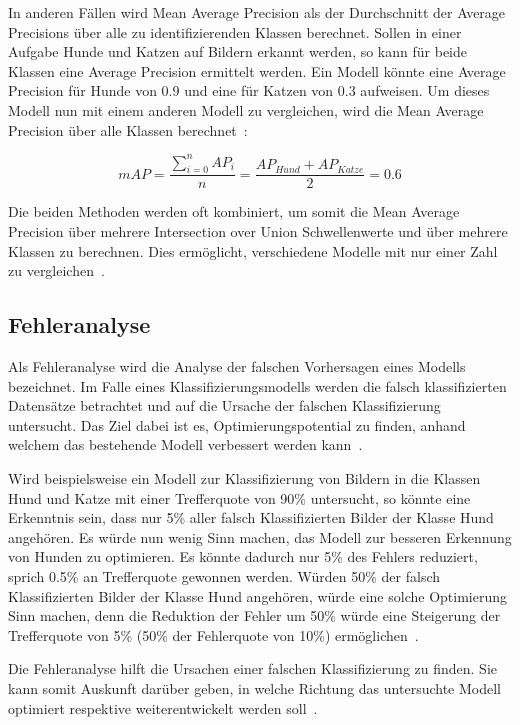 In anderen Fällen wird Mean Average Precision als der Durchschnitt der Average Precisions über alle zu identifizierenden Klassen berechnet. Sollen in einer Aufgabe Hunde und Katzen auf Bildern erkannt werden, so kann für beide Klassen eine Average Precision ermittelt werden. Ein Modell könnte eine Average Precision für Hunde von 0.9 und eine für Katzen von 0.3 aufweisen. Um dieses Modell nun mit einem anderen Modell zu vergleichen, wird die Mean Average Precision über alle Klassen berechnet~\autocite{AP}:

$$mAP = \frac{\sum_{i=0}^{n}AP_{i}}{n} = \frac{AP_{Hund}+AP_{Katze}}{2} = 0.6$$

Die beiden Methoden werden oft kombiniert, um somit die Mean Average Precision über mehrere Intersection over Union Schwellenwerte und über mehrere Klassen zu berechnen. Dies ermöglicht, verschiedene Modelle mit nur einer Zahl zu vergleichen~\autocite{AP}.

\subsection{Fehleranalyse}
\label{chap:error-analysis}

Als Fehleranalyse wird die Analyse der falschen Vorhersagen eines Modells bezeichnet. Im Falle eines Klassifizierungsmodells werden die falsch klassifizierten Datensätze betrachtet und auf die Ursache der falschen Klassifizierung untersucht. Das Ziel dabei ist es, Optimierungspotential zu finden, anhand welchem das bestehende Modell verbessert werden kann~\autocite{MLYearning}.

Wird beispielsweise ein Modell zur Klassifizierung von Bildern in die Klassen Hund und Katze mit einer Trefferquote von 90\% untersucht, so könnte eine Erkenntnis sein, dass nur 5\% aller falsch Klassifizierten Bilder der Klasse Hund angehören. Es würde nun wenig Sinn machen, das Modell zur besseren Erkennung von Hunden zu optimieren. Es könnte dadurch nur 5\% des Fehlers reduziert, sprich 0.5\% an Trefferquote gewonnen werden. Würden 50\% der falsch Klassifizierten Bilder der Klasse Hund angehören, würde eine solche Optimierung Sinn machen, denn die Reduktion der Fehler um 50\% würde eine Steigerung der Trefferquote von 5\% (50\% der Fehlerquote von 10\%) ermöglichen~\autocite{MLYearning}.

Die Fehleranalyse hilft die Ursachen einer falschen Klassifizierung zu finden. Sie kann somit Auskunft darüber geben, in welche Richtung das untersuchte Modell optimiert respektive weiterentwickelt werden soll~\autocite{MLYearning}.


